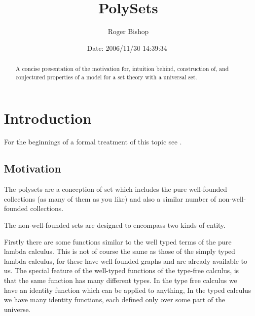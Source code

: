 \documentclass[numreferences]{rbjk}
\begin{document}
                                                                                   
\begin{article}
\begin{opening}  
\title{PolySets}
\author{Roger Bishop }
\date{$ $Date: 2006/11/30 14:39:34 $ $}

\begin{abstract}
A concise presentation of the motivation for, intuition behind, construction of, and conjectured properties of a model for a set theory with a universal set.
\end{abstract}
\end{opening}

\setcounter{tocdepth}{4}
{\parskip-0pt\tableofcontents}

\section{Introduction}

For the beginnings of a formal treatment of this topic see \cite{rbjt020}.

\subsection{Motivation}

The polysets are a conception of set which includes the pure well-founded collections (as many of them as you like) and also a similar number of non-well-founded collections.

The non-well-founded sets are designed to encompass two kinds of entity.

Firstly there are some functions similar to the well typed terms of the pure lambda calculus.
This is not of course the same as those of the simply typed lambda calculus, for these have well-founded graphs and are already available to us.
The special feature of the well-typed functions of the type-free calculus, is that the same function has many different types.
In the type free calculus we have an identity function which can be applied to anything,
In the typed calculus we have many identity functions, each defined only over some part of the universe.


\end{article}
\end{document}
